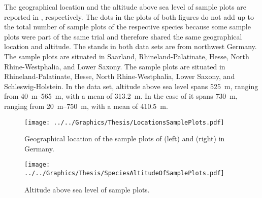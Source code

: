 The geographical location and the altitude above sea level of sample plots are reported in , respectively.  The dots in the plots of both figures do not add up to the total number of sample plots of the respective species because some sample plots were part of the same trial and therefore shared the same geographical location and altitude.  The stands in both data sets are from northwest Germany.  The \Beech{} sample plots are situated in Saarland, Rhineland-Palatinate, Hesse, North Rhine-Westphalia, and Lower Saxony.  The \Spruce{} sample plots are situated in Rhineland-Palatinate, Hesse, North Rhine-Westphalia, Lower Saxony, and Schleswig-Holstein.  In the \Beech{} data set, altitude above sea level spans \SI{525}{\meter}, ranging from \SIrange{40}{565}{\meter}, with a mean of \SI{313.2}{\meter}.  In the case of \Spruce{} it spans \SI{730}{\meter}, ranging from \SIrange{20}{750}{\meter}, with a mean of \SI{410.5}{\meter}.

\begin{figure}[h]
  \centering
  \texttt{[image: ../../Graphics/Thesis/LocationsSamplePlots.pdf]}
  \caption{Geographical location of the sample plots of \Beech{} (left) and \Spruce{} (right) in Germany.}
  \label{fig:LocationsSamplePlots}
\end{figure}

\begin{figure}[h]
  \centering
  \texttt{[image: ../../Graphics/Thesis/SpeciesAltitudeOfSamplePlots.pdf]}
  \caption{Altitude above sea level of sample plots.}
  \label{fig:SpeciesAltitudeOfSamplePlots}
\end{figure}


